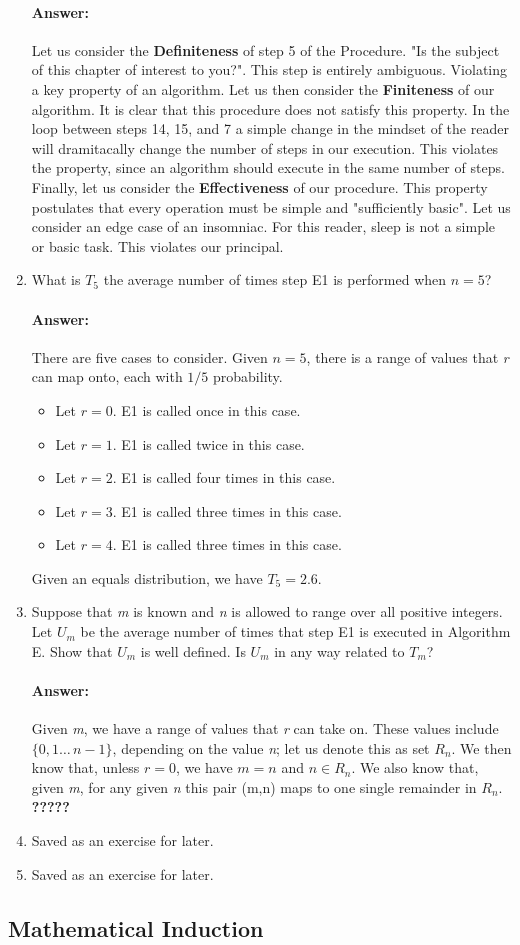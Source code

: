 \documentclass{article}
\begin{document}
\begin{enumerate}
		\paragraph{Answer:}
		Let us consider the \textbf{Definiteness} of step 5 of the Procedure. "Is the subject of this chapter of interest to you?". This step is entirely ambiguous. Violating a key property of an algorithm. Let us then consider the \textbf{Finiteness} of our algorithm. It is clear that this procedure does not satisfy this property. In the loop between steps 14, 15, and 7 a simple change in the mindset of the reader will dramitacally change the number of steps in our execution. This violates the property, since an algorithm should execute in the same number of steps. Finally, let us consider the \textbf{Effectiveness} of our procedure. This property postulates that every operation must be simple and "sufficiently basic". Let us consider an edge case of an insomniac. For this reader, sleep is not a simple or basic task. This violates our principal.
		\item What is $T_5$ the average number of times step E1 is performed when $n = 5$?
		\paragraph{Answer:}
		There are five cases to consider. Given $n = 5$, there is a range of values that \textit{r} can map onto, each with $1/5$ probability. 
		\begin{itemize}
			\item Let $r = 0$. E1 is called once in this case.
			\item Let $r = 1$. E1 is called twice in this case.
			\item Let $r = 2$. E1 is called four times in this case.
			\item Let $r = 3$. E1 is called three times in this case.
			\item Let $r = 4$. E1 is called three times in this case.
		\end{itemize}
		Given an equals distribution, we have $T_5 = 2.6$.
		\item Suppose that \textit{m} is known and \textit{n} is allowed to range over all positive integers. Let $U_m$ be the average number of times that step E1 is executed in Algorithm E. Show that $U_m$ is well defined. Is $U_m$ in any way related to $T_m$?
		\paragraph{Answer:}
		Given \textit{m}, we have a range of values that \textit{r} can take on. These values include $\{0, 1\dots\, n-1\}$, depending on the value \textit{n}; let us denote this as set $R_n$. We then know that, unless $r = 0$, we have $m = n$ and $n \in R_n$. We also know that, given \textit{m}, for any given \textit{n} this pair (m,n) maps to one single remainder in $R_n$. \textbf{?????}
		\item Saved as an exercise for later.
		\item Saved as an exercise for later.
	\end{enumerate}
	\subsection{Mathematical Induction}
\end{document}
